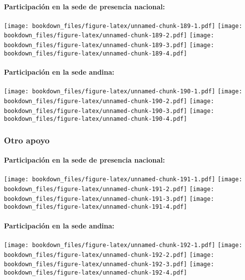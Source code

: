 \documentclass[]{article}
\let\oldparagraph\paragraph
\renewcommand{\paragraph}[1]{\oldparagraph{#1}\mbox{}}
\theoremstyle{definition}
\theoremstyle{definition}
\theoremstyle{definition}
\theoremstyle{remark}
\begin{document}
\paragraph{Participación en la sede de presencia
nacional:}\label{participacion-en-la-sede-de-presencia-nacional-11}

\texttt{[image: bookdown\_files/figure-latex/unnamed-chunk-189-1.pdf]}
\texttt{[image: bookdown\_files/figure-latex/unnamed-chunk-189-2.pdf]}
\texttt{[image: bookdown\_files/figure-latex/unnamed-chunk-189-3.pdf]}
\texttt{[image: bookdown\_files/figure-latex/unnamed-chunk-189-4.pdf]}

\paragraph{Participación en la sede
andina:}\label{participacion-en-la-sede-andina-11}

\texttt{[image: bookdown\_files/figure-latex/unnamed-chunk-190-1.pdf]}
\texttt{[image: bookdown\_files/figure-latex/unnamed-chunk-190-2.pdf]}
\texttt{[image: bookdown\_files/figure-latex/unnamed-chunk-190-3.pdf]}
\texttt{[image: bookdown\_files/figure-latex/unnamed-chunk-190-4.pdf]}

\subsubsection{Otro apoyo}\label{otro-apoyo-1}

\paragraph{Participación en la sede de presencia
nacional:}\label{participacion-en-la-sede-de-presencia-nacional-12}

\texttt{[image: bookdown\_files/figure-latex/unnamed-chunk-191-1.pdf]}
\texttt{[image: bookdown\_files/figure-latex/unnamed-chunk-191-2.pdf]}
\texttt{[image: bookdown\_files/figure-latex/unnamed-chunk-191-3.pdf]}
\texttt{[image: bookdown\_files/figure-latex/unnamed-chunk-191-4.pdf]}

\paragraph{Participación en la sede
andina:}\label{participacion-en-la-sede-andina-12}

\texttt{[image: bookdown\_files/figure-latex/unnamed-chunk-192-1.pdf]}
\texttt{[image: bookdown\_files/figure-latex/unnamed-chunk-192-2.pdf]}
\texttt{[image: bookdown\_files/figure-latex/unnamed-chunk-192-3.pdf]}
\texttt{[image: bookdown\_files/figure-latex/unnamed-chunk-192-4.pdf]}
\end{document}
